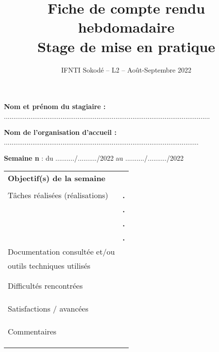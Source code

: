 \documentclass[a4paper,11pt]{article}
\title{\vspace{-2cm}Fiche de compte rendu hebdomadaire\\\vspace{.1cm}\Large Stage de mise en pratique}
\date{\vspace{-1cm}IFNTI Sokodé -- L2 -- Août-Septembre 2022}
\makeatletter
\newcommand{\mktitle}{\@maketitle}
\makeatother
\begin{document}
\mktitle\vspace{-.2cm}

\noindent\textbf{Nom et prénom du stagiaire :} .............................................................................................................\vspace{.4cm}

\noindent\textbf{Nom de l'organisation d'accueil :} .......................................................................................................\vspace{.4cm}

\noindent\textbf{Semaine n} : du ........../........../2022 au ........../........../2022\vspace{-.2cm}

\begin{center}
\begin{tabular}{|C{6cm}|p{10.3cm}|}
	\hline
	\textbf{Objectif(s) de la semaine} &\\&\\
	\hline
	Tâches réalisées (réalisations) & \hspace{.2cm}\huge\textbf{.}\\&\hspace{.2cm}\huge\textbf{.}\\&\hspace{.2cm}\huge\textbf{.}\\& \hspace{.2cm}\huge\textbf{.}\\
	\hline
	Documentation consultée et/ou &\\
	outils techniques utilisés &\\&\\&\\
	\hline
	Difficultés rencontrées &\\&\\&\\&\\
	\hline
	Satisfactions / avancées &\\&\\&\\&\\
	\hline
	Commentaires &\\&\\&\\&\\
	\hline
\end{tabular}\vspace{.35cm}
\begin{tabular}{|C{6cm}|p{10.3cm}|}

\end{tabular}
\end{center}
\end{document}

